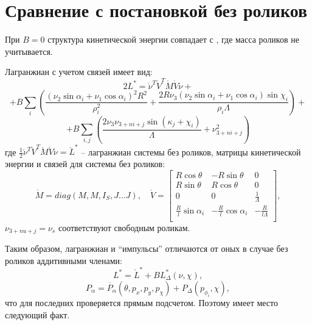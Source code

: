 \section{Сравнение с постановкой без роликов}

При $B=0$ структура кинетической энергии совпадает с  \cite{Zobova2011}, где масса роликов не учитывается.

Лагранжиан с учетом связей имеет вид:
$$ 2L^{*} = \mathring{\nu}^T \mathring{V}^T \mathring{M} \mathring{V} \mathring{\nu} + $$
$$ + B\sum_{i}(
	\frac{(\nu_2\sin\alpha_i+\nu_1\cos\alpha_i)^2R^2}
	{\rho_i^2} +
	\frac{2R\nu_3(\nu_2\sin\alpha_i+\nu_1\cos\alpha_i)\sin\chi_i}
	{\rho_i\Lambda}
) + $$
$$+ B\sum_{i,j}(
	\frac{2\nu_3\nu_{3+ni+j}\sin(\kappa_j+\chi_i)}
	{\Lambda}
	+
	\nu_{3+ni+j}^2
)
$$
где $\frac{1}{2}\mathring{\nu}^T \mathring{V}^T \mathring{M} \mathring{V} \mathring{\nu} = \mathring{L}^{*}$ -- лагранжиан системы без роликов, матрицы кинетической энергии и связей для системы без роликов:
$$
\mathring{M} = diag(M, M, I_S, J...J),
\quad
\mathring{V} = \begin{bmatrix}
    R\cos\theta & -R\sin\theta & 0 \\
    R\sin\theta & R\cos\theta  & 0 \\
    0           & 0            & \frac{1}{\Lambda} \\
    \frac{R}{l}\sin\alpha_i & -\frac{R}{l}\cos\alpha_i & -\frac{R}{l\Lambda} \\
\end{bmatrix},
$$
$\nu_{3+nu+j} = \nu_s$ соответствуют свободным роликам.

Таким образом, лагранжиан и ``импульсы'' отличаются от оных в случае без роликов аддитивными членами:
$$ L^{*} = \mathring{L}^{*} + BL^{*}_\Delta(\nu, \chi),$$
$$ P_\alpha = \mathring{P_\alpha}(\theta, p_x, p_y, p_\chi) + P_\Delta(p_{\phi_i}, \chi),$$
что для последних проверяется прямым подсчетом. Поэтому имеет место следующий факт.

